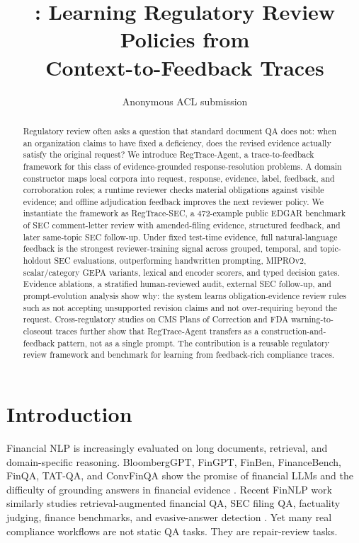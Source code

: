 \documentclass[11pt]{article}
\title{\framework{}: Learning Regulatory Review Policies from\\
Context-to-Feedback Traces}
\author{Anonymous ACL submission}
\newcommand{\dataset}{RegTrace-SEC}
\newcommand{\framework}{RegTrace-Agent}
\begin{document}
\maketitle
\begin{abstract}
Regulatory review often asks a question that standard document QA does not: when an organization claims to have fixed a deficiency, does the revised evidence actually satisfy the original request? We introduce \framework{}, a trace-to-feedback framework for this class of evidence-grounded response-resolution problems. A domain constructor maps local corpora into request, response, evidence, label, feedback, and corroboration roles; a runtime reviewer checks material obligations against visible evidence; and offline adjudication feedback improves the next reviewer policy. We instantiate the framework as \dataset{}, a 472-example public EDGAR benchmark of SEC comment-letter review with amended-filing evidence, structured feedback, and later same-topic SEC follow-up. Under fixed test-time evidence, full natural-language feedback is the strongest reviewer-training signal across grouped, temporal, and topic-holdout SEC evaluations, outperforming handwritten prompting, MIPROv2, scalar/category GEPA variants, lexical and encoder scorers, and typed decision gates. Evidence ablations, a stratified human-reviewed audit, external SEC follow-up, and prompt-evolution analysis show why: the system learns obligation-evidence review rules such as not accepting unsupported revision claims and not over-requiring beyond the request. Cross-regulatory studies on CMS Plans of Correction and FDA warning-to-closeout traces further show that \framework{} transfers as a construction-and-feedback pattern, not as a single prompt. The contribution is a reusable regulatory review framework and benchmark for learning from feedback-rich compliance traces.
\end{abstract}

\section{Introduction}

Financial NLP is increasingly evaluated on long documents, retrieval, and domain-specific reasoning. BloombergGPT, FinGPT, FinBen, FinanceBench, FinQA, TAT-QA, and ConvFinQA show the promise of financial LLMs and the difficulty of grounding answers in financial evidence \citep{wu2023bloomberggpt,yang2023fingpt,xie2024finben,islam2023financebench,chen2021finqa,zhu2021tatqa,chen2022convfinqa}. Recent FinNLP work similarly studies retrieval-augmented financial QA, SEC filing QA, factuality judging, finance benchmarks, and evasive-answer detection \citep{lithgow2025rag,lai2025secqa,klimaszewski2025avenibench,wu2025nli,nuaimi2025evasive}. Yet many real compliance workflows are not static QA tasks. They are repair-review tasks.
\end{document}
